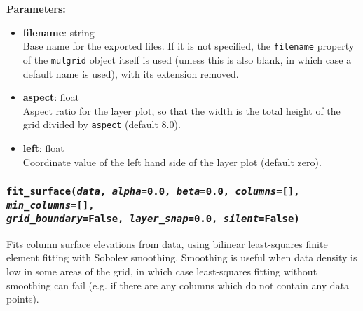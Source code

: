 \textbf{Parameters:}
\begin{itemize}
\item \textbf{filename}: string\\
  Base name for the exported files.  If it is not specified, the \texttt{filename} property of the \texttt{mulgrid} object itself is used (unless this is also blank, in which case a default name is used), with its extension removed.
\item \textbf{aspect}: float\\
  Aspect ratio for the layer plot, so that the width is the total height of the grid divided by \texttt{aspect} (default 8.0).
\item \textbf{left}: float\\
  Coordinate value of the left hand side of the layer plot (default zero).
\end{itemize}

\begin{snugshade}\subsubsection{\texttt{fit\_surface(\emph{data}, \emph{alpha}=0.0, \emph{beta}=0.0, \emph{columns}=[], \emph{min\_columns}=[], \\
    \emph{grid\_boundary}=False, \emph{layer\_snap}=0.0, \emph{silent}=False)}}\end{snugshade}
\label{sec:mulgrid:fit_surface}

Fits column surface elevations from data, using bilinear least-squares finite element fitting with Sobolev smoothing.  Smoothing is useful when data density is low in some areas of the grid, in which case least-squares fitting without smoothing can fail (e.g. if there are any columns which do not contain any data points).

